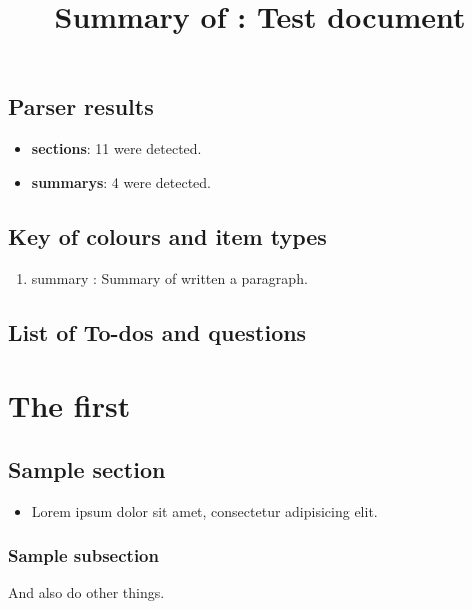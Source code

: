 \title{Summary of : Test document}
\maketitle

\section{Parser results}
    \begin{itemize}[noitemsep]
\item \textbf{sections}: 11 were detected.
\item \textbf{summarys}: 4 were detected.
    \end{itemize}

\section{Key of colours and item types}
    \begin{enumerate}[noitemsep]
        \item summary : Summary of written a paragraph.
    \end{enumerate}

\section{List of To-dos and questions}
\vspace{-36pt}\hspace{11pt}

\chapter{The first}
\label{autosec:0}
\vspace{-36pt}\hspace{11pt}
\section{Sample section}
\label{autosec:1}
    \begin{itemize}[noitemsep]
        \item Lorem ipsum dolor sit amet, consectetur adipisicing elit.
    \end{itemize}
\subsection{Sample subsection}
\label{autosec:2}
And also do other things.
